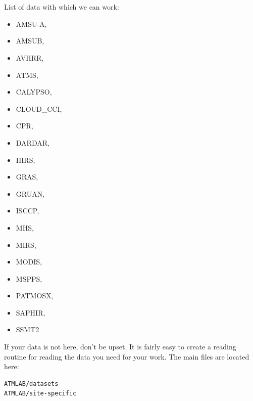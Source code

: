 \documentclass[12pt,a4paper]{article}
\begin{document}
\\\\
List of data with which we can work:
\begin{itemize}
\itemsep0em
\item AMSU-A, 
\item AMSUB, 
\item AVHRR,
\item ATMS, 
\item CALYPSO, 
\item CLOUD\_CCI, 
\item CPR, 
\item DARDAR, 
\item HIRS, 
\item GRAS, 
\item GRUAN, 
\item ISCCP, 
\item MHS, 
\item MIRS, 
\item MODIS, 
\item MSPPS, 
\item PATMOSX, 
\item SAPHIR, 
\item SSMT2
\end{itemize}

If your data is not here, don’t be upset. It is fairly easy to create a reading routine for reading the data you need for your work.
The main files are located here:
\begin{lstlisting}
ATMLAB/datasets
ATMLAB/site-specific
\end{lstlisting}
\end{document}
